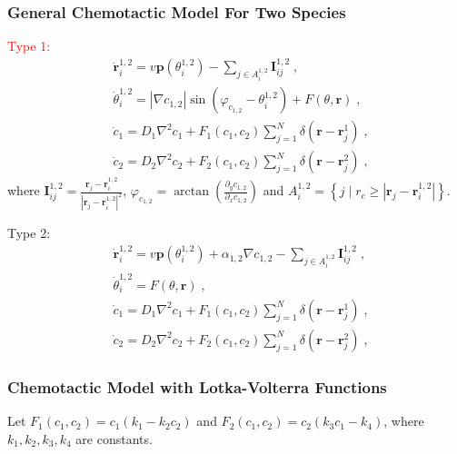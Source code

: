 \documentclass{article}
\begin{document}
\subsubsection{General Chemotactic Model For Two Species}
\textcolor{red}{Type 1:}
\begin{subequations}
    \begin{align}
        &\dot{\mathbf{r}}_{i}^{1,2}=v\mathbf{p}\left( \theta _{i}^{1,2} \right) -\sum_{j\in A_{i}^{1,2}}{\mathbf{I}_{ij}^{1,2}\;,}\\
        &\dot{\theta}_{i}^{1,2}=\left| \nabla c_{1,2} \right|\sin \left( \varphi _{c_{1,2}}-\theta _{i}^{1,2} \right) +F\left( \theta ,\mathbf{r} \right) \;,\\
        &\dot{c}_1=D_1\nabla ^2c_1+F_1\left( c_1,c_2 \right) \sum_{j=1}^N{\delta \left( \mathbf{r}-\mathbf{r}_{j}^{1} \right) \;,}\\
        &\dot{c}_2=D_2\nabla ^2c_2+F_2\left( c_1,c_2 \right) \sum_{j=1}^N{\delta \left( \mathbf{r}-\mathbf{r}_{j}^{2} \right) \;,}
    \end{align}
\end{subequations}
where $\mathbf{I}_{ij}^{1,2}=\frac{\mathbf{r}_j-\mathbf{r}_{i}^{1,2}}{|\mathbf{r}_j-\mathbf{r}_{i}^{1,2}|^{2}}$, $\varphi _{c_{1,2}}=\arctan \left( \frac{\partial _yc_{1,2}}{\partial _xc_{1,2}} \right) $ and $A_{i}^{1,2}=\left\{ j\mid r_c\geqslant | \mathbf{r}_j-\mathbf{r}_{i}^{1,2} | \right\}$.

\noindent Type 2:
\begin{subequations}
    \begin{align}
        &\dot{\mathbf{r}}_{i}^{1,2}=v\mathbf{p}\left( \theta _{i}^{1,2} \right) +\alpha _{1,2}\nabla c_{1,2}-\sum_{j\in A_{i}^{1,2}}{\mathbf{I}_{ij}^{1,2}\;,}\\
        &\dot{\theta}_{i}^{1,2}=F\left( \theta ,\mathbf{r} \right) \;,\\
        &\dot{c}_1=D_1\nabla ^2c_1+F_1\left( c_1,c_2 \right) \sum_{j=1}^N{\delta \left( \mathbf{r}-\mathbf{r}_{j}^{1} \right) \;,}\\
        &\dot{c}_2=D_2\nabla ^2c_2+F_2\left( c_1,c_2 \right) \sum_{j=1}^N{\delta \left( \mathbf{r}-\mathbf{r}_{j}^{2} \right) \;,}
    \end{align}
\end{subequations}

\subsubsection{Chemotactic Model with Lotka-Volterra Functions}
Let $F_1\left( c_1,c_2 \right)=c_1\left( k_1-k_2c_2 \right)$ and $F_2\left( c_1,c_2 \right)=c_2\left( k_3c_1-k_4 \right)$, where $k_1,k_2,k_3,k_4$ are constants.
\end{document}
